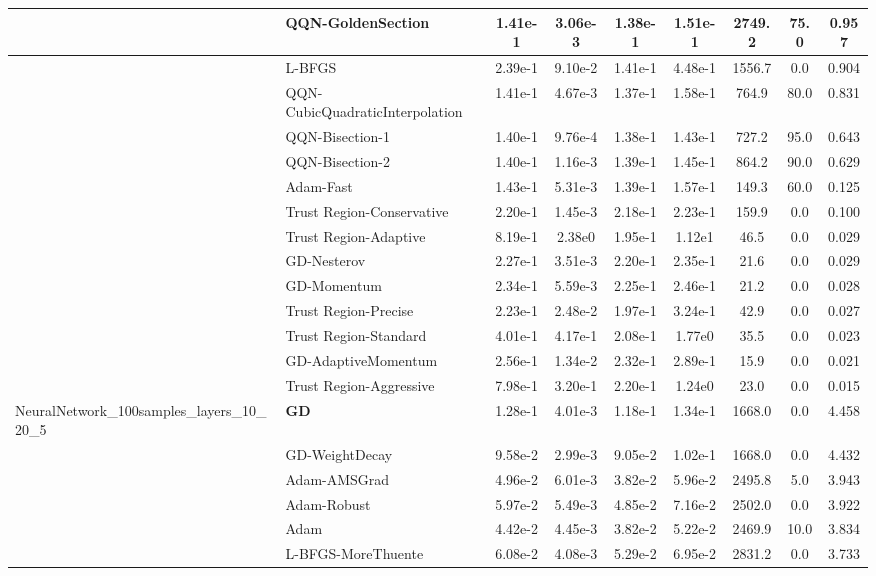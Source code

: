 \documentclass[10pt]{article}
\begin{document}
\begin{longtable}{|l|l|c|c|c|c|c|c|c|}
\hline
 & QQN-GoldenSection & 1.41e-1 & 3.06e-3 & 1.38e-1 & 1.51e-1 & 2749.2 & 75.0 & 0.957 \\
\hline
 & L-BFGS & 2.39e-1 & 9.10e-2 & 1.41e-1 & 4.48e-1 & 1556.7 & 0.0 & 0.904 \\
\hline
 & QQN-CubicQuadraticInterpolation & 1.41e-1 & 4.67e-3 & 1.37e-1 & 1.58e-1 & 764.9 & 80.0 & 0.831 \\
\hline
 & QQN-Bisection-1 & 1.40e-1 & 9.76e-4 & 1.38e-1 & 1.43e-1 & 727.2 & 95.0 & 0.643 \\
\hline
 & QQN-Bisection-2 & 1.40e-1 & 1.16e-3 & 1.39e-1 & 1.45e-1 & 864.2 & 90.0 & 0.629 \\
\hline
 & Adam-Fast & 1.43e-1 & 5.31e-3 & 1.39e-1 & 1.57e-1 & 149.3 & 60.0 & 0.125 \\
\hline
 & Trust Region-Conservative & 2.20e-1 & 1.45e-3 & 2.18e-1 & 2.23e-1 & 159.9 & 0.0 & 0.100 \\
\hline
 & Trust Region-Adaptive & 8.19e-1 & 2.38e0 & 1.95e-1 & 1.12e1 & 46.5 & 0.0 & 0.029 \\
\hline
 & GD-Nesterov & 2.27e-1 & 3.51e-3 & 2.20e-1 & 2.35e-1 & 21.6 & 0.0 & 0.029 \\
\hline
 & GD-Momentum & 2.34e-1 & 5.59e-3 & 2.25e-1 & 2.46e-1 & 21.2 & 0.0 & 0.028 \\
\hline
 & Trust Region-Precise & 2.23e-1 & 2.48e-2 & 1.97e-1 & 3.24e-1 & 42.9 & 0.0 & 0.027 \\
\hline
 & Trust Region-Standard & 4.01e-1 & 4.17e-1 & 2.08e-1 & 1.77e0 & 35.5 & 0.0 & 0.023 \\
\hline
 & GD-AdaptiveMomentum & 2.56e-1 & 1.34e-2 & 2.32e-1 & 2.89e-1 & 15.9 & 0.0 & 0.021 \\
\hline
 & Trust Region-Aggressive & 7.98e-1 & 3.20e-1 & 2.20e-1 & 1.24e0 & 23.0 & 0.0 & 0.015 \\
NeuralNetwork\_100samples\_layers\_10\_20\_5 & \textbf{GD} & 1.28e-1 & 4.01e-3 & 1.18e-1 & 1.34e-1 & 1668.0 & 0.0 & 4.458 \\
\hline
 & GD-WeightDecay & 9.58e-2 & 2.99e-3 & 9.05e-2 & 1.02e-1 & 1668.0 & 0.0 & 4.432 \\
\hline
 & Adam-AMSGrad & 4.96e-2 & 6.01e-3 & 3.82e-2 & 5.96e-2 & 2495.8 & 5.0 & 3.943 \\
\hline
 & Adam-Robust & 5.97e-2 & 5.49e-3 & 4.85e-2 & 7.16e-2 & 2502.0 & 0.0 & 3.922 \\
\hline
 & Adam & 4.42e-2 & 4.45e-3 & 3.82e-2 & 5.22e-2 & 2469.9 & 10.0 & 3.834 \\
\hline
 & L-BFGS-MoreThuente & 6.08e-2 & 4.08e-3 & 5.29e-2 & 6.95e-2 & 2831.2 & 0.0 & 3.733 \\

\end{longtable}
\end{document}
